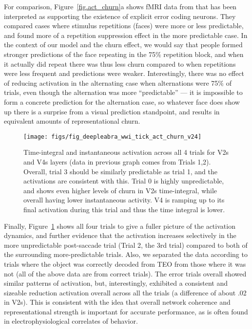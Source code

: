 \documentclass[11pt,twoside]{article}
\newif\myifpdf
\begin{document}
For comparison, Figure~\ref{fig.act_churn}a shows fMRI data from  that has been interpreted as supporting the existence of explicit error coding neurons.  They compared cases where stimulus repetitions (faces) were more or less predictable, and found more of a repetition suppression effect in the more predictable case.  In the context of our model and the churn effect, we would say that people formed stronger predictions of the face repeating in the 75\% repetition block, and when it actually did repeat there was thus less churn compared to when repetitions were less frequent and predictions were weaker.  Interestingly, there was no effect of reducing activation in the alternating case when alternations were 75\% of trials, even though the alternation was more ``predictable'' --- it is impossible to form a concrete prediction for the alternation case, so whatever face does show up there is a surprise from a visual prediction standpoint, and results in equivalent amounts of representational churn.

\begin{figure}
  \centering\texttt{[image: figs/fig\_deepleabra\_wwi\_tick\_act\_churn\_v24]}
  \caption{\footnotesize Time-integral and instantaneous activation across all 4 trials for V2s and V4s layers (data in previous graph comes from Trials 1,2).  Overall, trial 3 should be similarly predictable as trial 1, and the activations are consistent with this.  Trial 0 is highly unpredictable, and shows even higher levels of churn in V2s time-integral, while overall having lower instantaneous activity.  V4 is ramping up to its final activation during this trial and thus the time integral is lower.}
  \label{fig.act_churn_all}
\end{figure}

Finally, Figure~\ref{fig.act_churn_all} shows all four trials to give a fuller picture of the activation dynamics, and further evidence that the activation increases selectively in the more unpredictable post-saccade trial (Trial 2, the 3rd trial) compared to both of the surrounding more-predictable trials.  Also, we separated the data according to trials where the object was correctly decoded from TEO from those where it was not (all of the above data are from correct trials).  The error trials overall showed similar patterns of activation, but, interestingly, exhibited a consistent and sizeable reduction activation overall across all the trials (a difference of about .02 in V2s).  This is consistent with the idea that overall network coherence and representational strength is important for accurate performance, as is often found in electrophysiological correlates of behavior.
\end{document}
